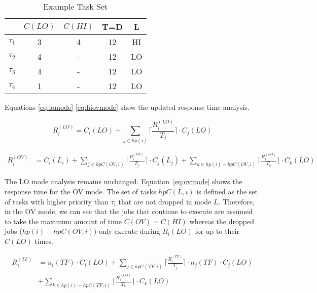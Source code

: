 	
	
	\begin{table}[t!]
\caption{Example Task Set}
\centering

	\begin{tabular}{@{}lcccc@{}}
	\toprule
	& $C(LO)$ & $C(HI)$ & T=D & L 	 \\
	\bottomrule
	$\tau_1$ & 3 & 4 & 12 & HI  \\
	$\tau_2$ & 4 & - & 12 & LO  \\
	$\tau_3$ & 4 & - & 12 & LO  \\
	$\tau_4$ & 1 & - & 12 & LO  \\
	\end{tabular}

\label{t:example}
\end{table}
	
	Equations \ref{eq:lomode}-\ref{eq:hiovmode} show the updated response time analysis.
	
	
\begin{equation}
R_i^{(LO)}= C_i(LO)+\sum_{j \in hp(i)}\Big\lceil\frac{R_i^{(LO)}}{T_j}\Big\rceil \cdot C_j(LO)
\label{eq:lomode}
\end{equation}

\begin{equation}\label{eq:ovmode}
\begin{aligned}
R_i^{(OV)} &  = C_i(L_i)+\sum_{j \in hpC(OV,i)}\Big\lceil\frac{R_i^{(OV)}}{T_j}\Big\rceil \cdot C_j(L_j) 
 +\sum_{k \in hp(i)-hpC(OV,i)}\Big\lceil\frac{R_i^{(LO)}}{T_k}\Big\rceil \cdot C_k(LO)
\end{aligned}
\end{equation}
	
	
	The LO mode analysis remains unchanged. Equation~\ref{eq:ovmode} shows the response time for the OV mode. 
	The set of tasks $hpC(L,i)$ is defined as the set of tasks with higher priority than $\tau_i$ that are not dropped in mode $L$. 
	Therefore, in the OV mode, we can see that the jobs that continue to execute are assumed to take the maximum amount of time $C(OV)=C(HI)$ whereas the dropped jobs ($hp(i) - hpC(OV,i)$) only execute during $R_i(LO)$ for up to their $C(LO)$ times.
	
\begin{equation}\label{eq:tfmode}
\begin{aligned}
R_i^{(TF)} & = n_i(TF) \cdot C_i(LO)
+\sum_{j \in hpC(TF,i)}\Big\lceil\frac{R_i^{(TF)}}{T_j}\Big\rceil \cdot n_j(TF) \cdot C_j(LO) \\
&  +\sum_{k \in hp(i)-hpC(TF,i)}\Big\lceil\frac{R_i^{(LO)}}{T_k}\Big\rceil \cdot C_k(LO)
\end{aligned}
\end{equation}

